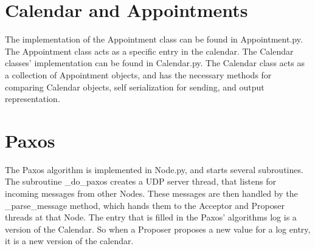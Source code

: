 \documentclass{article}
\begin{document}
	\section{Calendar and Appointments}
		The implementation of the Appointment class can be found in Appointment.py. The Appointment class acts as a specific entry in the calendar. The Calendar classes' implementation can be found in Calendar.py. The Calendar class acts as a collection of Appointment objects, and has the necessary methods for comparing Calendar objects, self serialization for sending, and output representation.
	\section{Paxos}
		The Paxos algorithm is implemented in Node.py, and starts several subroutines. The subroutine  \_do\_paxos creates a UDP server thread, that listens for incoming messages from other Nodes. These messages are then handled by the \_parse\_message method, which hands them to the Acceptor and Proposer
		threads at that Node.  The entry that is filled in the Paxos' algorithms log is a version of the Calendar. So when a Proposer proposes a new value for a log entry, it is a new version of the calendar.
\end{document}
